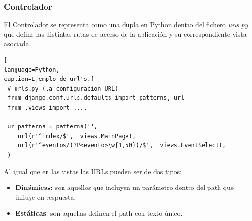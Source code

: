 \subsubsection*{Controlador}
El Controlador se representa como una dupla en Python dentro del fichero \textit{urls.py} que define las distintas rutas de acceso de la aplicación y su correspondiente vista asociada.
\begin{lstlisting}[
language=Python,
caption=Ejemplo de url's.]
 # urls.py (la configuracion URL)
 from django.conf.urls.defaults import patterns, url
 from .views import ....

 urlpatterns = patterns('',
 	url(r'^index/$',  views.MainPage),
	url(r'^eventos/(?P<evento>\w{1,50})/$',  views.EventSelect),
 )
\end{lstlisting}
Al igual que en las vistas las URLs pueden ser de dos tipos:
\begin{itemize}
\item \textbf{Dinámicas:} son aquellos que incluyen un parámetro dentro del path que influye en respuesta.
\item \textbf{Estáticas:} son aquellas definen el path con texto único.
\end{itemize}

